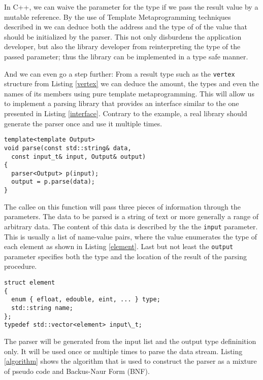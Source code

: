 In C++, we can waive the parameter for the type if we pass the result value by a
mutable reference. By the use of Template Metaprogramming techniques described
in \cite{Abrahams:2004:CTM:1044941} we can deduce both the address and the type
of of the value that should be initialized by the parser. This not only
disburdens the application developer, but also the library developer from
reinterpreting the type of the passed parameter; thus the library can be
implemented in a type safe manner.

And we can even go a step further: From a result type such as the
\texttt{vertex} structure from Listing \ref{vertex} we can deduce the amount,
the types and even the names of its members using pure template metaprogramming. 
This will allow us to implement a parsing library that provides an interface
similar to the one presented in Listing \ref{interface}. Contrary to the
example, a real library should generate the parser once and use it multiple
times.

\begin{lstlisting}[frame=tb,label=interface,caption=parser interface]
template<template Output>
void parse(const std::string& data,
  const input_t& input, Output& output)
{
  parser<Output> p(input);
  output = p.parse(data);
}
\end{lstlisting}

The callee on this function will pass three pieces of information through the
parameters. The data to be parsed is a string of text or more generally a range
of arbitrary data. The content of this data is described by the the
\texttt{input} parameter. This is usually a list of name-value pairs, where the
value enumerates the type of each element as shown in Listing \ref{element}.
Last but not least the \texttt{output} parameter specifies both the type and the
location of the result of the parsing procedure.

\begin{lstlisting}[frame=tb,label=element,caption=element type]
struct element
{
  enum { efloat, edouble, eint, ... } type; 
  std::string name;
};
typedef std::vector<element> input\_t;
\end{lstlisting}

The parser will be generated from the input list and the output type
defininition only. It will be used once or multiple times to parse the data
stream. Listing \ref{algorithm} shows the algorithm that is used to construct
the parser as a mixture of pseudo code and Backus-Naur Form (BNF).

